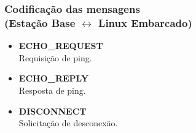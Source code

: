 \documentclass{beamer}
\begin{document}
  
  \begin{frame}
    \frametitle{Codificação das mensagens\\ (Estação Base $\leftrightarrow$ Linux Embarcado)}
    \begin{itemize}
      \item \textbf{ECHO\_REQUEST}\\
	Requisição de ping.
      \item \textbf{ECHO\_REPLY}\\
	Resposta de ping.
      \item \textbf{DISCONNECT} \\
	Solicitação de desconexão.
    \end{itemize}
  \end{frame}
  
  
\end{document}
